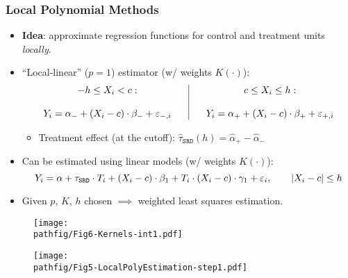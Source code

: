 \documentclass[9pt]{beamer}
\renewcommand{\c}{c}
\newcommand{\pathfig}{figures}
\begin{document}
\begin{frame}\frametitle{Local Polynomial Methods}
	\begin{itemize}
		\item \textbf{Idea}: approximate regression functions for control and treatment units \emph{locally}.\bigskip
		
		\item ``Local-linear'' ($p=1$) estimator (w/ weights $K(\cdot)$):\medskip
		\[%
		\begin{tabular}
			[c]{cc|cc}%
			$-h\leq X_{i}<\c:$ &  &  & $\c\leq X_{i}\leq h:$\\
			&  &  & \\
			$Y_{i}=\alpha_{-}+(X_{i}-\c)\cdot\beta_{-}+\varepsilon_{-,i}$ &  &  &
			$Y_{i}=\alpha_{+}+(X_{i}-\c)\cdot\beta_{+}+\varepsilon_{+,i}$%
		\end{tabular}
		\]
		\medskip
		
		\begin{itemize}
			\item Treatment effect (at the cutoff): $\hat{\tau}_{\mathtt{SRD}}(h)=\hat{\alpha}_{+}-\hat{\alpha}_{-}$\bigskip
		\end{itemize}
		
		\item Can be estimated using linear models (w/ weights $K(\cdot)$):
		\[Y_{i}=\alpha+\tau_{\mathtt{SRD}}\cdot T_{i}+(X_{i}-\c)\cdot\beta_{1}+T_{i}\cdot(X_{i}-\c)\cdot\gamma_{1}+\varepsilon_{i}, \qquad |X_{i}-c|\leq h\medskip\]
		
		\item Given $p$, $K$, $h$ chosen $\implies$ weighted least squares estimation.\smallskip
	\end{itemize}
\end{frame}

\begin{frame}
	\begin{figure}[h]
		\begin{center}
			\texttt{[image: \\pathfig/Fig6-Kernels-int1.pdf]}
		\end{center}
	\end{figure}
\end{frame}

\begin{frame}
	\begin{figure}[h]
		\begin{center}
			\texttt{[image: \\pathfig/Fig5-LocalPolyEstimation-step1.pdf]}
		\end{center}
	\end{figure}
\end{frame}
\end{document}
